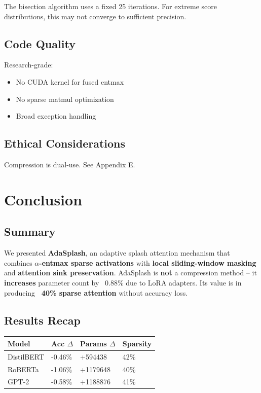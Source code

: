 The bisection algorithm uses a fixed 25 iterations. For extreme score 
distributions, this may not converge to sufficient precision.

\subsection{Code Quality}

Research-grade:
\begin{itemize}
\item No CUDA kernel for fused entmax
\item No sparse matmul optimization
\item Broad exception handling

\end{itemize}
\subsection{Ethical Considerations}

Compression is dual-use. See Appendix E.


\section{Conclusion}

\subsection{Summary}

We presented \textbf{AdaSplash}, an adaptive splash attention mechanism that 
combines \textbf{$\alpha$-entmax sparse activations} with \textbf{local sliding-window masking} 
and \textbf{attention sink preservation}. AdaSplash is \textbf{not} a compression 
method -- it \textbf{increases} parameter count by ~0.88\% due to LoRA 
adapters. Its value is in producing \textbf{~40\% sparse attention} without 
accuracy loss.

\subsection{Results Recap}

\begin{table}[H]
\centering
\small
\begin{tabular}{llll}
\toprule
\textbf{Model} & \textbf{Acc $\Delta$} & \textbf{Params $\Delta$} & \textbf{Sparsity} \\
\midrule
DistilBERT & -0.46\% & +594438 & 42\% \\
RoBERTa & -1.06\% & +1179648 & 40\% \\
GPT-2 & -0.58\% & +1188876 & 41\% \\
\bottomrule
\end{tabular}
\end{table}

